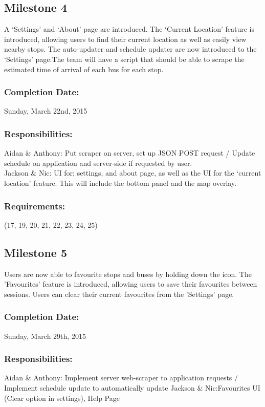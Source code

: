 \documentclass[a4paper,12pt]{article}
\begin{document}
\subsection{Milestone 4}
A ‘Settings’ and ‘About’ page are introduced. The ‘Current Location’ feature is introduced, allowing users to find their current location as well as easily view nearby stops. The auto-updater and schedule updater are now introduced to the ‘Settings’ page.The team will have a script that should be able to scrape the estimated time of arrival of each bus for each stop.
\subsubsection{Completion Date:} Sunday, March 22nd, 2015
\subsubsection{Responsibilities:}
Aidan \& Anthony: Put scraper on server, set up JSON POST request / Update schedule on application and server-side if requested by user.\\
Jackson \& Nic: UI for; settings, and about page, as well as the UI for the ‘current location’ feature. This will include the bottom panel and the map overlay.
\subsubsection{Requirements:} (17, 19, 20, 21, 22, 23, 24, 25)
\pagebreak

\subsection{Milestone 5}
Users are now able to favourite stops and buses by holding down the icon. The 'Favourites' feature is introduced, allowing users to save their favourites between sessions. Users can clear their current favourites from the 'Settings' page. 
\subsubsection{Completion Date:} Sunday, March 29th, 2015
\subsubsection{Responsibilities:}
	Aidan \& Anthony: Implement server web-scraper to application requests / Implement schedule update to automatically update 
Jackson \& Nic:Favourites UI (Clear option in settings), Help Page
\end{document}
